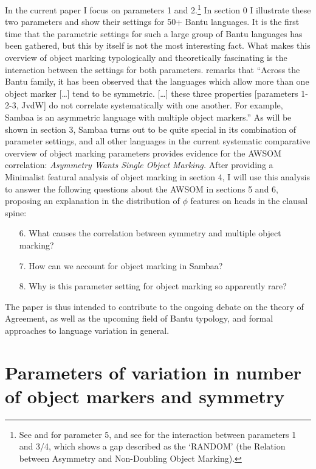 \documentclass[output=paper
,modfonts
,nonflat]{langsci/langscibook}
\begin{document}
In the current paper I focus on parameters 1 and 2.\footnote{See \citet{Beaudoin-Lietz_et_al2004} and \citet{Marlo2015} for parameter 5, and see \citet{Van_der_Wal2017b} for the interaction between parameters 1 and 3/4, which shows a gap described as the ‘RANDOM’ (the Relation between Asymmetry and Non-Doubling Object Marking).} 
In section 0 I illustrate these two parameters and show their settings for 50+ Bantu languages. It is the first time that the parametric settings for such a large group of Bantu languages has been gathered, but this by itself is not the most interesting fact. What makes this overview of object marking typologically and theoretically fascinating is the interaction between the settings for both parameters. \citet[78]{Riedel2009} remarks that “Across the Bantu family, it has been observed that the languages which allow more than one object marker […] tend to be symmetric. […] these three properties [parameters 1-2-3, JvdW] do not correlate systematically with one another. For example, Sambaa is an asymmetric language with multiple object markers.” As will be shown in section 3, Sambaa turns out to be quite special in its combination of parameter settings, and all other languages in the current systematic comparative overview of object marking parameters provides evidence for the AWSOM correlation: \textit{Asymmetry Wants Single Object Marking.} After providing a Minimalist featural analysis of object marking in section 4, I will use this analysis to answer the following questions about the AWSOM in sections 5 and 6, proposing an explanation in the distribution of $\phi$ features on heads in the clausal spine:
\begin{enumerate}
\item[6.]What causes the correlation between symmetry and multiple object marking?
\item[7.]How can we account for object marking in Sambaa?
\item[8.]Why is this parameter setting for object marking so apparently rare?
\end{enumerate}
The paper is thus intended to contribute to the ongoing debate on the theory of Agreement, as well as the upcoming field of Bantu typology, and formal approaches to language variation in general.

\section{Parameters of variation in number of object markers and symmetry}
\end{document}
